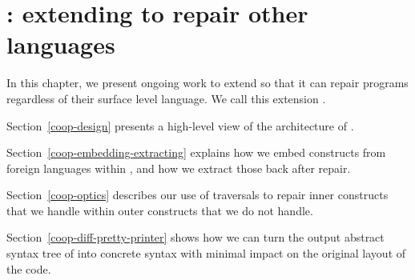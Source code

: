\chapter{\Coop{}: extending \Chick{} to repair other languages}\label{coop}

In this chapter, we present ongoing work to extend \Chick{} so that it can
repair programs regardless of their surface level language.  We call this
extension \Coop{}.

Section~\ref{coop-design} presents a high-level view of the architecture of
\Coop{}.

Section~\ref{coop-embedding-extracting} explains how we embed constructs from
foreign languages within \Chick{}, and how we extract those back after repair.

Section~\ref{coop-optics} describes our use of traversals to repair inner
constructs that we handle within outer constructs that we do not handle.

Section~\ref{coop-diff-pretty-printer} shows how we can turn the output abstract
syntax tree of \Coop{} into concrete syntax with minimal impact on the original
layout of the code.





